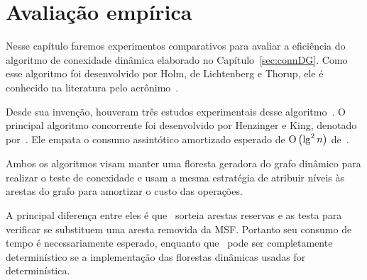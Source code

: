 \chapter{Avaliação empírica}
\label{sec:avaliacao-empirica}

Nesse capítulo faremos experimentos comparativos para avaliar a eficiência do algoritmo de conexidade dinâmica elaborado no Capítulo~\ref{sec:connDG}. Como esse algoritmo foi desenvolvido  por Holm, de Lichtenberg e Thorup, ele é conhecido na literatura pelo acrônimo~\HDT.

Desde sua invenção, houveram três estudos experimentais desse algoritmo~\cite{EmpiricalStudy1997, EmpiricalStudy2002, Zaroliagis2002}.
O principal algoritmo concorrente foi desenvolvido por Henzinger e King, denotado por~\HK.
Ele empata o consumo assintótico amortizado esperado de $\text{O}\left(\lg^2 n\right)$ de~\HDT.

Ambos os algoritmos visam manter uma floresta geradora do grafo dinâmico para realizar o teste de conexidade e usam a mesma estratégia de atribuir níveis às arestas do grafo para amortizar o custo das operações.

A principal diferença entre eles é que~\HK{} sorteia arestas reservas e as testa para verificar se substituem uma aresta removida da MSF. Portanto seu consumo de tempo é necessariamente esperado, enquanto que~\HDT{} pode ser completamente determinístico se a implementação das florestas dinâmicas usadas for determinística. 



